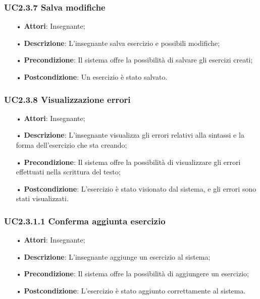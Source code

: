 \subsubsection{UC2.3.7	Salva modifiche}
\begin{itemize}
	\item[•] \textbf{Attori}: Insegnante;
	\item[•] \textbf{Descrizione}: L'insegnante salva esercizio e possibili modifiche;
	\item[•] \textbf{Precondizione}: Il sistema offre la possibilità di salvare gli esercizi creati;
	\item[•] \textbf{Postcondizione}: Un esercizio è stato salvato.
\end{itemize}

\subsubsection{UC2.3.8 Visualizzazione errori}
\begin{itemize}
	\item[•] \textbf{Attori}: Insegnante;
	\item[•] \textbf{Descrizione}: L'insegnante visualizza gli errori relativi alla sintassi e la forma dell’esercizio che sta creando;
	\item[•] \textbf{Precondizione}: Il sistema offre la possibilità di visualizzare gli errori effettuati nella scrittura del testo;
	\item[•] \textbf{Postcondizione}: L’esercizio è stato visionato dal sistema, e gli errori sono stati visualizzati.
\end{itemize}

\subsubsection{UC2.3.1.1 Conferma aggiunta esercizio}
\begin{itemize}
	\item[•] \textbf{Attori}: Insegnante;
	\item[•] \textbf{Descrizione}: L'insegnante aggiunge un esercizio al sistema;
	\item[•] \textbf{Precondizione}: Il sistema offre la possibilità di aggiungere un esercizio;
	\item[•] \textbf{Postcondizione}: L’esercizio è stato aggiunto correttamente al sistema.
\end{itemize}

